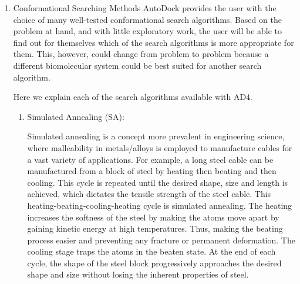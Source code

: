 \documentclass[11pt]{article}
\begin{document}
\begin{enumerate}
\item Conformational Searching Methods
AutoDock provides the user with the choice of many well-tested conformational search algorithms. Based on the problem at hand, and with little exploratory work, the user will be able to find out for themselves which of the search algorithms is more appropriate for them. This, however, could change from problem to problem because a different biomolecular system could be best suited for another search algorithm. 

Here we explain each of the search algorithms available with AD4. 
\begin{enumerate}
\item Simulated Annealing (SA): 

Simulated annealing is a concept more prevalent in engineering science, where malleability in metals/alloys is employed to manufacture cables for a vast variety of applications. For example, a long steel cable can be manufactured from a block of steel by heating then beating and then cooling. This cycle is repeated until the desired shape, size and length is achieved, which dictates the tensile strength of the steel cable. This heating-beating-cooling-heating cycle is simulated annealing. The heating increases the softness of the steel by making the atoms move apart by gaining kinetic energy at high temperatures. Thus, making the beating process easier and preventing any fracture or permanent deformation. The cooling stage traps the atoms in the beaten state. At the end of each cycle, the shape of the steel block progressively approaches the desired shape and size without losing the inherent properties of steel. 


\end{enumerate}
\end{enumerate}
\end{document}
